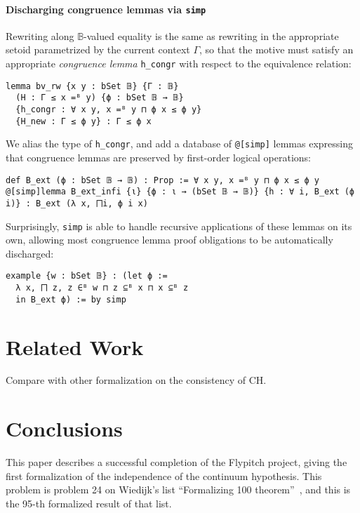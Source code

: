 \documentclass[sigplan,10pt,review, autoref,anonymous]{acmart}
\newcommand{\lil}{\lstinline}
\theoremstyle{definition}
\begin{document}
\paragraph{Discharging congruence lemmas via \texttt{simp}} Rewriting along \(\mathbb{B}\)-valued equality is the same as rewriting in the appropriate setoid parametrized by the current context \(\Gamma\), so that the motive must satisfy an appropriate \emph{congruence lemma} \lil{h_congr} with respect to the equivalence relation:

\begin{lstlisting}
lemma bv_rw {x y : bSet 𝔹} {Γ : 𝔹}
  (H : Γ ≤ x =ᴮ y) {ϕ : bSet 𝔹 → 𝔹}
  {h_congr : ∀ x y, x =ᴮ y ⊓ ϕ x ≤ ϕ y}
  {H_new : Γ ≤ ϕ y} : Γ ≤ ϕ x
\end{lstlisting}

We alias the type of \lil{h_congr}, and add a database of \lil{@[simp]} lemmas expressing that congruence lemmas are preserved by first-order logical operations:

\begin{lstlisting}
def B_ext (ϕ : bSet 𝔹 → 𝔹) : Prop := ∀ x y, x =ᴮ y ⊓ ϕ x ≤ ϕ y
@[simp]lemma B_ext_infi {ι} {ϕ : ι → (bSet 𝔹 → 𝔹)} {h : ∀ i, B_ext (ϕ i)} : B_ext (λ x, ⨅i, ϕ i x)
\end{lstlisting}

Surprisingly, \lil{simp} is able to handle recursive applications of these lemmas on its own, allowing most congruence lemma proof obligations to be automatically discharged:

\begin{lstlisting}
example {w : bSet 𝔹} : (let ϕ :=
  λ x, ⨅ z, z ∈ᴮ w ⊓ z ⊆ᴮ x ⊓ x ⊆ᴮ z
  in B_ext ϕ) := by simp
\end{lstlisting}

\section{Related Work}
\label{section:related-work}
Compare with other formalization on the consistency of CH.

\section{Conclusions}
\label{section:conclusions}

This paper describes a successful completion of the Flypitch project, giving the first formalization of the independence of the continuum hypothesis.
This problem is problem 24 on Wiedijk's list ``Formalizing 100 theorem''~\cite{wiedijk100theorems},
and this is the 95-th formalized result of that list.
\end{document}
